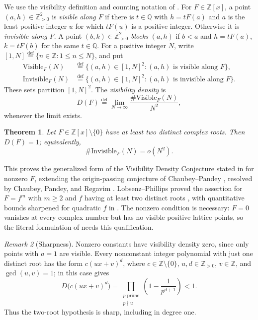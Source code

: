\documentclass[10pt]{amsart}
\newtheorem{theorem}{Theorem}
\theoremstyle{remark}
\newtheorem{remark}[theorem]{Remark}
\newcommand{\Z}{\mathbb{Z}}
\newcommand{\Q}{\mathbb{Q}}
\newcommand{\defeq}{\stackrel{\mathrm{def}}{=}}
\newcommand{\Visible}{\mathrm{Visible}}
\newcommand{\Invisible}{\mathrm{Invisible}}
\begin{document}
\smallskip
We use the visibility definition and counting notation of
\cite[Definition~2.1 and \S2]{LP}.
For $F\in\Z[x]$, a point $(a,h)\in\Z_{>0}^2$ is \emph{visible along $F$}
if there is $t\in\Q$ with $h=tF(a)$ and $a$ is the least positive
integer $u$ for which $tF(u)$ is a positive integer. Otherwise it is
\emph{invisible along $F$}. A point $(b,k)\in\Z_{>0}^2$ \emph{blocks}
$(a,h)$ if $b<a$ and $h=tF(a)$, $k=tF(b)$ for the same $t\in\Q$.
For a positive integer $N$, write $[1,N]\defeq\{n\in\Z:1\leq n\leq N\}$, and put
\begin{equation}\label{eq:visible-invisible}
\begin{aligned}
 \Visible_F(N)&\defeq\{(a,h)\in[1,N]^2:(a,h)\text{ is visible along }F\},\\
 \Invisible_F(N)&\defeq\{(a,h)\in[1,N]^2:(a,h)\text{ is invisible along }F\}.
\end{aligned}
\end{equation}
These sets partition $[1,N]^2$. The \emph{visibility density} is
\begin{equation}\label{eq:density}
 D(F)\defeq\lim_{N\to\infty}\frac{\#\Visible_F(N)}{N^2},
\end{equation}
whenever the limit exists.

\begin{theorem}\label{thm:main}
Let $F\in\Z[x]\setminus\{0\}$ have at least two distinct complex roots.
Then $D(F)=1$; equivalently,
\[
                         \#\Invisible_F(N)=o(N^2).
\]
\end{theorem}

This proves the generalized form of the Visibility Density Conjecture stated in
\cite[Conjecture~1.1]{LP} for nonzero $F$, extending the origin-passing conjecture of
Chaubey--Pandey \cite[Conjecture~1.6]{CP}, resolved by Chaubey, Pandey,
and Regavim \cite{CPR}. Lobsenz--Phillips proved the assertion for
$F=f^m$ with $m\geq2$ and $f$ having at least two distinct roots
\cite[Theorems~1.2--1.3]{LP}, with quantitative bounds sharpened for
quadratic $f$ in \cite{LPQ}.
The nonzero condition is necessary: $F=0$ vanishes at every complex number
but has no visible positive lattice points, so the literal formulation of
\cite[Conjecture~1.1]{LP} needs this qualification.

\begin{remark}[Sharpness]
Nonzero constants have visibility density zero, since only points with $a=1$
are visible. Every nonconstant integer polynomial with just one distinct
root has the form $c(ux+v)^d$, where $c\in\Z\setminus\{0\}$,
$u,d\in\Z_{>0}$, $v\in\Z$, and $\gcd(u,v)=1$; in this case
\cite[\S1, equation~(7)]{LP} gives
\[
 D\bigl(c(ux+v)^d\bigr)=
 \prod_{\substack{p\text{ prime}\\p\nmid u}}\left(1-\frac{1}{p^{d+1}}\right)<1.
\]
Thus the two-root hypothesis is sharp, including in degree one.
\end{remark}
\end{document}
